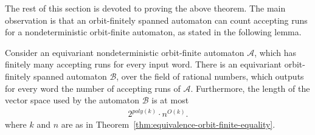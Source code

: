 \documentclass[10pt,a4paper]{amsart}
\numberwithin{equation}{section}
\newcommand{\Aa}{{\mathcal A}}
\newcommand{\Bb}{{\mathcal B}}
\begin{document}
The rest of this section is devoted to proving the above theorem. The main observation is that an orbit-finitely spanned automaton can count accepting runs for a nondeterministic orbit-finite automaton, as stated in the following lemma. 
\begin{lemma}\label{lem:unambiguous-to-weighted} Consider an equivariant nondeterministic orbit-finite automaton $\Aa$, which has finitely many accepting runs for every input word. There is an equivariant orbit-finitely spanned automaton $\Bb$, over the field of rational numbers, which outputs for every word the number of accepting runs of $\Aa$.  Furthermore, the length of the vector space used by the automaton $\Bb$ is at most 
    \begin{align}\label{eq:length-bound}
        2^{poly(k)} \cdot n^{O(k)}. 
        \end{align}
where $k$ and $n$ are as in Theorem~\ref{thm:equivalence-orbit-finite-equality}.
\end{lemma}
\end{document}
